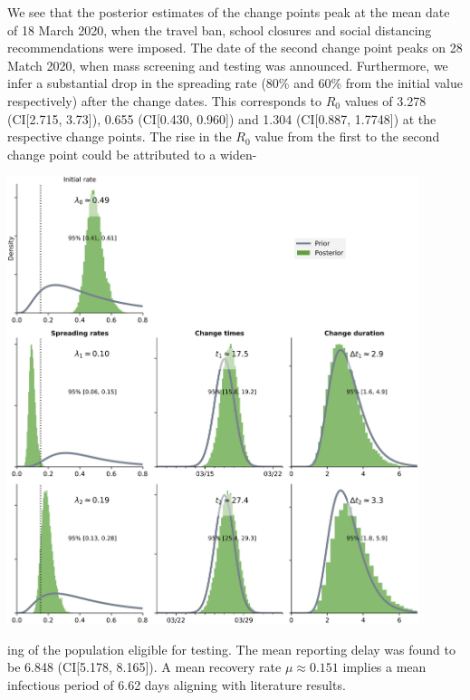\begin{minipage}{0.4\textwidth}
	We see that the posterior estimates of the change points peak at the mean date of 18 March 2020, when the travel ban, school closures and social distancing recommendations were imposed. The date of the second change point peaks on 28 Match 2020, when mass screening and testing was announced. Furthermore, we infer a substantial drop in the spreading rate (80\% and 60\% from the initial value respectively) after the change dates. This corresponds to $R_0$ values of 3.278 (CI[2.715, 3.73]), 0.655 (CI[0.430, 0.960]) and 1.304 (CI[0.887, 1.7748]) at the respective change points. The rise in the $R_0$ value from the first to the second change point could be attributed to a widen-
\end{minipage}
\begin{minipage}[c]{0.6\textwidth}
	\centering
	\includegraphics[width=0.9\textwidth]{V5}
	\label{V5}		
\end{minipage}
\newline \newline
ing of the population eligible for testing. The mean reporting delay was found to be 6.848 (CI[5.178, 8.165]). A mean recovery rate $\mu \approx 0.151$ implies a mean infectious period of 6.62 days aligning with literature results. 
\newline \newline
